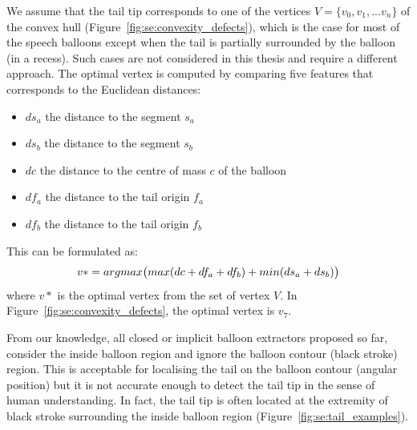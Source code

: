 We assume that the tail tip corresponds to one of the vertices $V=\{v_0,v_1,...v_n\}$ of the convex hull (Figure~\ref{fig:se:convexity_defects}), which is the case for most of the speech balloons except when the tail is partially surrounded by the balloon (in a recess).
Such cases are not considered in this thesis and require a different approach.
The optimal vertex is computed by comparing five features that corresponds to the Euclidean distances:

\begin{itemize}
   \item $ds_a$ the distance to the segment $s_a$
   \item $ds_b$ the distance to the segment $s_b$
   \item $dc$ the distance to the centre of mass $c$ of the balloon
   \item $df_a$ the distance to the tail origin $f_a$
   \item $df_b$ the distance to the tail origin $f_b$
 \end{itemize}

This can be formulated as:
\begin{equation}\label{eq:se:optimisation}
   v* = argmax\big( max(dc+df_a+df_b) + min(ds_a + ds_b) \big)\\
 \end{equation}
 where $v*$ is the optimal vertex from the set of vertex $V$.
In Figure~\ref{fig:se:convexity_defects}, the optimal vertex is $v_7$.


From our knowledge, all closed or implicit balloon extractors proposed so far, consider the inside balloon region and ignore the balloon contour (black stroke) region.
This is acceptable for localising the tail on the balloon contour (angular position) but it is not accurate enough to detect the tail tip in the sense of human understanding.
In fact, the tail tip is often located at the extremity of black stroke surrounding the inside balloon region (Figure~\ref{fig:se:tail_examples}).


